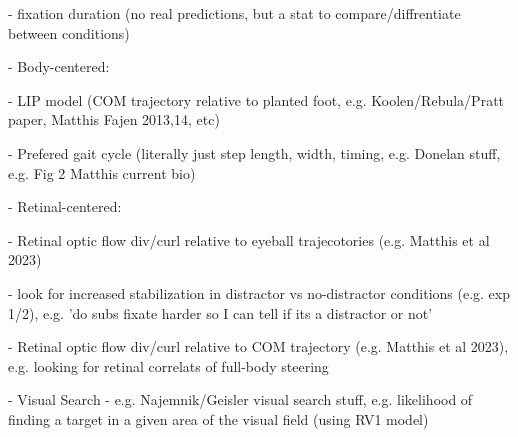    - fixation duration (no real predictions, but a stat to compare/diffrentiate between conditions)
  
  - Body-centered:
  
      - LIP model (COM trajectory relative to planted foot, e.g. Koolen/Rebula/Pratt paper, Matthis Fajen 2013,14, etc)
      
      - Prefered gait cycle (literally just step length, width, timing, e.g. Donelan stuff, e.g. Fig 2 Matthis current bio)

  
  - Retinal-centered:
  
      - Retinal optic flow div/curl relative to eyeball trajecotories (e.g. Matthis et al 2023)
      
        - look for increased stabilization in distractor vs no-distractor conditions (e.g. exp 1/2), e.g. 'do subs fixate harder so I can tell if its a distractor or not'
        
        - Retinal optic flow div/curl relative to COM trajectory (e.g. Matthis et al 2023), e.g. looking for retinal correlats of full-body steering
      
      - Visual Search - e.g. Najemnik/Geisler visual search stuff, e.g. likelihood of finding a target in a given area of the visual field (using RV1 model)




